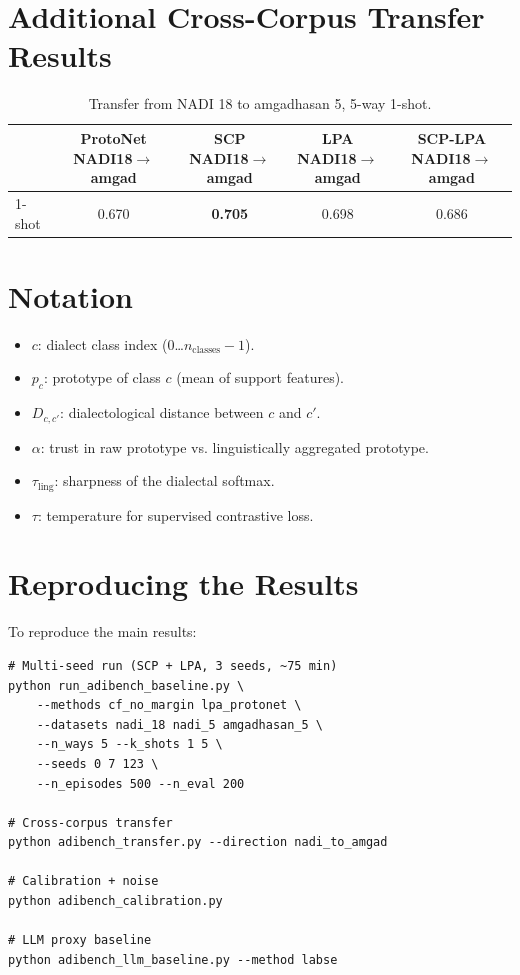 \documentclass[11pt,a4paper]{article}
\begin{document}
\section{Additional Cross-Corpus Transfer Results}

\begin{table}[h]
\centering\small
\begin{tabular}{lcccc}
\toprule
& \makecell{ProtoNet\\NADI18$\to$amgad} & \makecell{SCP\\NADI18$\to$amgad} & \makecell{LPA\\NADI18$\to$amgad} & \makecell{SCP-LPA\\NADI18$\to$amgad} \\
\midrule
1-shot & 0.670 & \textbf{0.705} & 0.698 & 0.686 \\
\bottomrule
\end{tabular}
\caption{Transfer from NADI 18 to amgadhasan 5, 5-way 1-shot.}
\end{table}

\section{Notation}
\begin{itemize}\itemsep0pt
\item $c$: dialect class index (0\ldots $n_{\text{classes}}-1$).
\item $p_c$: prototype of class $c$ (mean of support features).
\item $D_{c,c'}$: dialectological distance between $c$ and $c'$.
\item $\alpha$: trust in raw prototype vs. linguistically aggregated prototype.
\item $\tau_{\text{ling}}$: sharpness of the dialectal softmax.
\item $\tau$: temperature for supervised contrastive loss.
\end{itemize}

\section{Reproducing the Results}
To reproduce the main results:
\begin{verbatim}
# Multi-seed run (SCP + LPA, 3 seeds, ~75 min)
python run_adibench_baseline.py \
    --methods cf_no_margin lpa_protonet \
    --datasets nadi_18 nadi_5 amgadhasan_5 \
    --n_ways 5 --k_shots 1 5 \
    --seeds 0 7 123 \
    --n_episodes 500 --n_eval 200

# Cross-corpus transfer
python adibench_transfer.py --direction nadi_to_amgad

# Calibration + noise
python adibench_calibration.py

# LLM proxy baseline
python adibench_llm_baseline.py --method labse
\end{verbatim}
\end{document}
